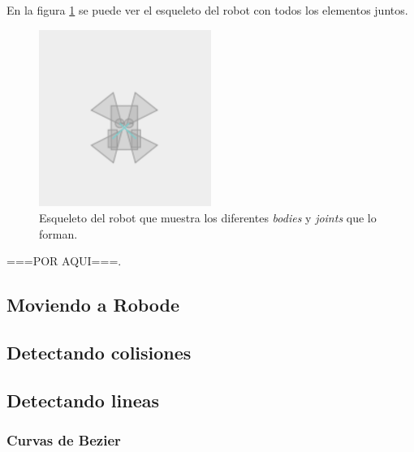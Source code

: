 {En la figura \ref{fig:robot-skel} se puede ver el esqueleto del robot con todos los elementos juntos.

\begin{figure}[!ht]
	\begin{centering}
		\includegraphics[width=0.5\textwidth]{images/robot-skel.png}
			\caption{Esqueleto del robot que muestra los diferentes \emph{bodies} y \emph{joints} que lo forman.}
				\label{fig:robot-skel}
	\end{centering}
\end{figure}

{\color{green} ===POR AQUI===}.



\subsection{Moviendo a Robode}
\label{moviendo-robode}



\subsection{Detectando colisiones}
\label{detectando-colisiones}



\subsection{Detectando lineas}
\label{detectando-lineas}

\subsubsection{Curvas de Bezier}
\label{bezier}



}
